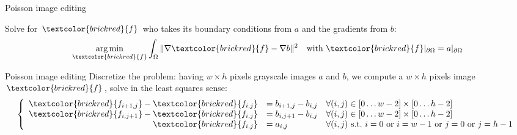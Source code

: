 \documentclass[UKenglish,aspectratio=169]{beamer}
\DeclareMathOperator*{\argmin}{arg\,min}
\newcommand\unknown[1]{\textcolor{brickred}{#1}}
\begin{document}
\begin{frame}{Poisson image editing}
\begin{minipage}{.12\linewidth}
\end{minipage}
\qquad
\pause
\begin{minipage}{.6\linewidth}
Solve for $\unknown{f}$ who takes its boundary conditions from $a$ and the gradients from $b$:
$$
\argmin\limits_{\unknown{f}} \int_\Omega \|\nabla \unknown{f} - \nabla b\|^2 \quad \text{with~} \unknown{f}|_{\partial\Omega} = a|_{\partial\Omega}
$$
\end{minipage}
\end{frame}

\begin{frame}{Poisson image editing}
Discretize the problem: having $w \times h$ pixels grayscale images $a$ and $b$,
we compute a $w \times h$ pixels image $\unknown{f}$, solve in the least squares sense:
$$
\left \{ \begin{array}{rll}
\unknown{f_{i+1, j}}-\unknown{f_{i,j}} & = b_{i+1, j}-b_{i,j} & \forall (i,j) \in [0 \dots w-2] \times [0\dots h-2]\\
\unknown{f_{i, j+1}}-\unknown{f_{i,j}} & = b_{i, j+1}-b_{i,j} & \forall (i,j) \in [0 \dots w-2] \times [0\dots h-2]\\
\unknown{f_{i,j}}            & = a_{i,j}            & \forall (i,j) \text{~s.t.~} i=0 \text{~or~} i=w-1 \text{~or~} j=0 \text{~or~} j=h-1
\end{array} \right.
$$
\end{frame}
\end{document}
